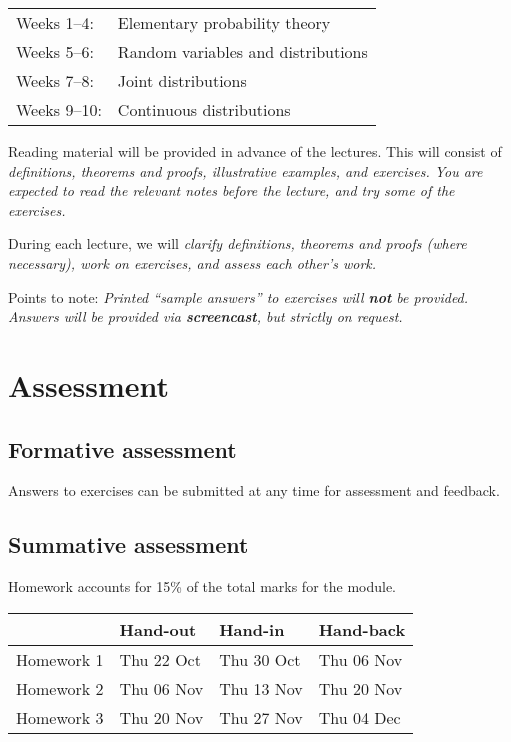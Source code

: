 \begin{tabular}{ll}
Weeks 1--4:	    & Elementary probability theory \\
Weeks 5--6:	    & Random variables and distributions \\
Weeks 7--8:	    & Joint distributions \\
Weeks 9--10:	& Continuous distributions 
\end{tabular}

\bigskip
Reading material will be provided in advance of the lectures. This will consist of
\ben
\it definitions,
\it theorems and proofs,
\it illustrative examples, and
\it exercises.
\een
You are expected to read the relevant notes \emph{before} the lecture, and try some of the exercises.

\newpage

During each lecture, we will
\ben
\it clarify definitions, theorems and proofs (where necessary),
\it work on exercises, and
\it assess each other's work.
\een

Points to note:
\bit
\it Printed ``sample answers'' to exercises will \textbf{not} be provided.
\it Answers will be provided via \textbf{screencast}, but strictly on request.
\eit

\section{Assessment}

\subsection*{Formative assessment}
Answers to exercises can be submitted at any time for assessment and feedback.

\subsection*{Summative assessment}
Homework accounts for 15\% of the total marks for the module.
\begin{table}[h]
\centering
\begin{tabular}{|llll|}\hline
			& Hand-out      & Hand-in       & Hand-back \\ \hline
Homework 1  & Thu 22 Oct    & Thu 30 Oct    & Thu 06 Nov \\
Homework 2  & Thu 06 Nov    & Thu 13 Nov    & Thu 20 Nov \\
Homework 3  & Thu 20 Nov    & Thu 27 Nov    & Thu 04 Dec \\ \hline 
\end{tabular}
\end{table}

